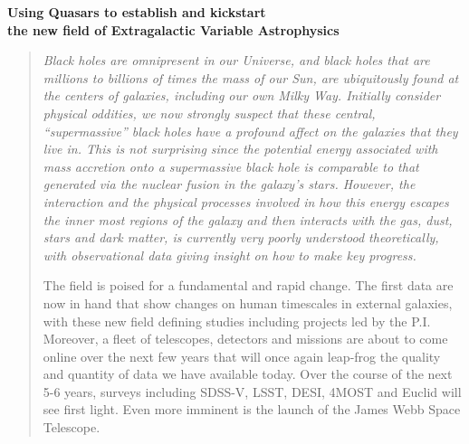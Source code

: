 \documentclass[oneside, a4paper, onecolumn, 11pt]{article}
\begin{document}
\begin{center}
 {\Large \bf \textcolor{Cerulean}{Using Quasars to establish and kickstart \\}}
\vspace{4pt} 
  {\Large \bf \textcolor{Cerulean}{the new field of Extragalactic Variable Astrophysics} }
\end{center}

\begin{quotation}
\noindent
{\it 
Black holes are omnipresent in our Universe, and black holes that are
millions to billions of times the mass of our Sun, are ubiquitously
found at the centers of galaxies, including our own Milky Way.
Initially consider physical oddities, we now strongly suspect that
these central, ``supermassive'' black holes have a profound
affect on the galaxies that they live in. This is not surprising since
the potential energy associated with mass accretion onto a
supermassive black hole is comparable to that generated via the
nuclear fusion in the galaxy's stars.
However, the interaction and the physical processes involved in how
this energy escapes the inner most regions of the galaxy and then
interacts with the gas, dust, stars and dark matter, is currently very
poorly understood theoretically, with observational data giving
insight on how to make key progress.

The field is poised for a fundamental and rapid change. The first data
are now in hand that show changes on human timescales in external
galaxies, with these new field defining studies including projects led
by the P.I.  Moreover, a fleet of telescopes, detectors and missions
are about to come online over the next few years that will once again
leap-frog the quality and quantity of data we have available
today. Over the course of the next 5-6 years, surveys including
SDSS-V, LSST, DESI, 4MOST and Euclid will see first light. Even more
imminent is the launch of the James Webb Space Telescope.

}
\end{quotation}
\end{document}
